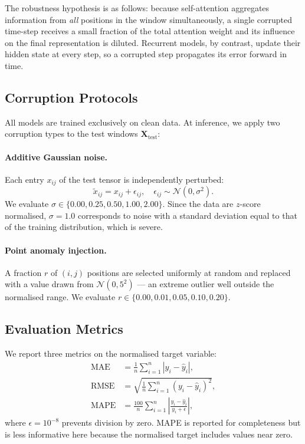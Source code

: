 \documentclass[runningheads]{llncs}
\begin{document}
The robustness hypothesis is as follows: because self-attention aggregates information from \emph{all} positions in the window simultaneously, a single corrupted time-step receives a small fraction of the total attention weight and its influence on the final representation is diluted. Recurrent models, by contrast, update their hidden state at every step, so a corrupted step propagates its error forward in time.

\subsection{Corruption Protocols}
\label{sec:corruption}

All models are trained exclusively on clean data. At inference, we apply two corruption types to the test windows $\mathbf{X}_\text{test}$:

\paragraph{Additive Gaussian noise.}
Each entry $x_{ij}$ of the test tensor is independently perturbed:
\begin{equation}
  \tilde{x}_{ij} = x_{ij} + \epsilon_{ij}, \quad \epsilon_{ij} \sim \mathcal{N}(0, \sigma^2).
\end{equation}
We evaluate $\sigma \in \{0.00, 0.25, 0.50, 1.00, 2.00\}$. Since the data are $z$-score normalised, $\sigma = 1.0$ corresponds to noise with a standard deviation equal to that of the training distribution, which is severe.

\paragraph{Point anomaly injection.}
A fraction $r$ of $(i, j)$ positions are selected uniformly at random and replaced with a value drawn from $\mathcal{N}(0, 5^2)$ — an extreme outlier well outside the normalised range. We evaluate $r \in \{0.00, 0.01, 0.05, 0.10, 0.20\}$.

\subsection{Evaluation Metrics}
\label{sec:metrics}

We report three metrics on the normalised target variable:
\begin{align}
  \text{MAE}  &= \frac{1}{n}\sum_{i=1}^{n}|y_i - \hat{y}_i|,\\
  \text{RMSE} &= \sqrt{\frac{1}{n}\sum_{i=1}^{n}(y_i - \hat{y}_i)^2},\\
  \text{MAPE} &= \frac{100}{n}\sum_{i=1}^{n}\left|\frac{y_i - \hat{y}_i}{y_i + \epsilon}\right|,
\end{align}
where $\epsilon = 10^{-8}$ prevents division by zero. MAPE is reported for completeness but is less informative here because the normalised target includes values near zero.
\end{document}
